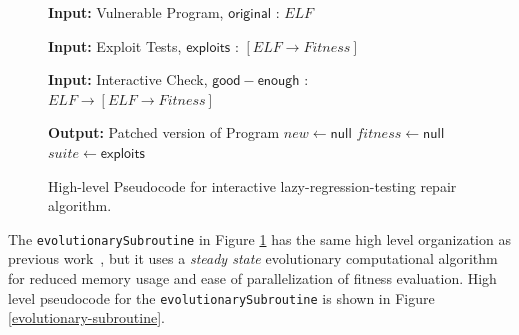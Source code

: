\documentclass{sigcomm-alternate}
\begin{document}
\begin{figure}[htb]
\begin{algorithmic}[1]
\small
\item[{\textbf{Input: }} {Vulnerable Program, $\mathsf{original}$ : $ELF$}]
\item[{\textbf{Input: }} {Exploit Tests, $\mathsf{exploits}$ : $[ELF \rightarrow Fitness]$}]
\item[{\textbf{Input: }} {Interactive Check, $\mathsf{good-enough}$ : $ELF \rightarrow [ELF \rightarrow Fitness]$}]
\item[{\textbf{Output: }} {Patched version of Program}] 
   $new \leftarrow \mathsf{null}$ 
   $fitness \leftarrow \mathsf{null}$ 
   $suite \leftarrow \mathsf{exploits}$ 
\end{algorithmic}
\caption{\label{lazy-algorithm}High-level Pseudocode for interactive
lazy-regression-testing repair algorithm.}
\end{figure}

The \texttt{evolutionarySubroutine} in Figure \ref{lazy-algorithm} has
the same high level organization as previous work~\cite{genprog-tse-journal},
but it uses a \emph{steady state}
evolutionary computational algorithm~\cite{Luke2013Metaheuristics} for
reduced memory usage and ease of parallelization of fitness evaluation.
High level pseudocode for the \texttt{evolutionarySubroutine} is shown in
Figure \ref{evolutionary-subroutine}.
\end{document}
